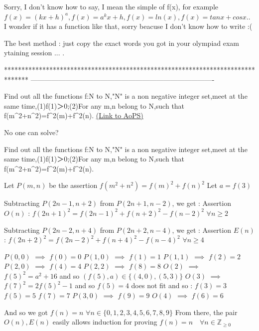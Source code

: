 \begin{solution}
	\begin{tcolorbox}Sorry, I don't know how to say, I mean the simple of f(x), for example $f(x)=(kx+h)^a, f(x)=a^kx+h, f(x)=ln(x), f(x)=tanx+cosx$.. I wonder if it has a function like that, sorry beacuse I don't know how to write  :(\end{tcolorbox}
The best method : just copy the exact words you got in your olympiad exam \/ ytaining session ... .



\end{solution}
*******************************************************************************
-------------------------------------------------------------------------------

\begin{problem}
	Find out all the functions f:N to N,"N" is a non negative integer set,meet at the same time,(1)f(1)＞0;(2)For any m,n belong to N,such that f(m^2+n^2)=f^2(m)+f^2(n).
	\flushright \href{https://artofproblemsolving.com/community/c6h1625918}{(Link to AoPS)}
\end{problem}



\begin{solution}
	No one can solve?
\end{solution}



\begin{solution}
	\begin{tcolorbox}Find out all the functions f:N to N,"N" is a non negative integer set,meet at the same time,(1)f(1)＞0;(2)For any m,n belong to N,such that f(m^2+n^2)=f^2(m)+f^2(n).\end{tcolorbox}
Let $P(m,n)$ be the assertion $f(m^2+n^2)=f(m)^2+f(n)^2$
Let $a=f(3)$

Subtracting $P(2n-1,n+2)$ from $P(2n+1,n-2)$, we get :
Assertion $O(n)$ : $f(2n+1)^2=f(2n-1)^2+f(n+2)^2-f(n-2)^2$ $\forall n\ge 2$

Subtracting $P(2n-2,n+4)$ from $P(2n+2,n-4)$, we get :
Assertion $E(n)$ : $f(2n+2)^2=f(2n-2)^2+f(n+4)^2-f(n-4)^2$ $\forall n\ge 4$

$P(0,0)$ $\implies$ $f(0)=0$
$P(1,0)$ $\implies$ $f(1)=1$
$P(1,1)$ $\implies$ $f(2)=2$
$P(2,0)$ $\implies$ $f(4)=4$
$P(2,2)$ $\implies$ $f(8)=8$
$O(2)$ $\implies$ $f(5)^2=a^2+16$ and so $(f(5),a)\in\{(4,0),(5,3)\}$
$O(3)$ $\implies$ $f(7)^2=2f(5)^2-1$ and so $f(5)=4$ does not fit and so :
$f(3)=3$
$f(5)=5$
$f(7)=7$
$P(3,0)$ $\implies$ $f(9)=9$
$O(4)$ $\implies$ $f(6)=6$

And so we got $f(n)=n$ $\forall n\in\{0,1,2,3,4,5,6,7,8,9\}$
From there, the pair $O(n),E(n)$ easily allows induction for proving 
$\boxed{f(n)=n\quad\forall n\in\mathbb Z_{\ge 0}}$



\end{solution}




